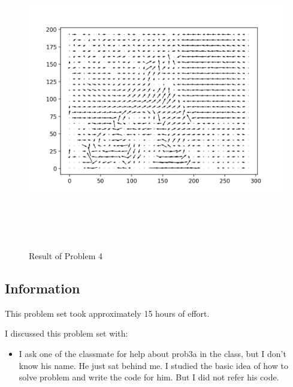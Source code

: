 \documentclass{article}
\newcommand{\info}{\clearpage \subsection*{Information}}
\begin{document}
\begin{figure}[!h]
  \centering
  \includegraphics[height=13cm]{code/outputs/prob4.png}
  \caption{Result of Problem 4}
  \label{fig:prb4}
\end{figure}

\info

This problem set took approximately 15 hours of effort.

I discussed this problem set with:
\begin{itemize}
  \item I ask one of the classmate for help about prob3a in the class, but I don't know his name. He just sat behind me. 
  I studied the basic idea of how to solve problem and write the code for him. But I did not refer his code.

\end{itemize}

\end{document}
